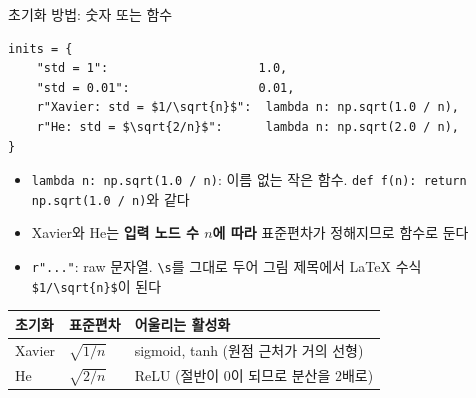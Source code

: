 \documentclass[aspectratio=169,11pt]{beamer}
\newcommand{\code}[1]{\texttt{#1}}
\begin{document}
\begin{frame}[fragile]{초기화 방법: 숫자 또는 함수}
\begin{lstlisting}
inits = {
    "std = 1":                     1.0,
    "std = 0.01":                  0.01,
    r"Xavier: std = $1/\sqrt{n}$":  lambda n: np.sqrt(1.0 / n),
    r"He: std = $\sqrt{2/n}$":      lambda n: np.sqrt(2.0 / n),
}
\end{lstlisting}
\begin{itemize}
\item \code{lambda n: np.sqrt(1.0 / n)}: 이름 없는 작은 함수. \code{def f(n): return np.sqrt(1.0 / n)}와 같다
\item Xavier와 He는 \textbf{입력 노드 수 $n$에 따라} 표준편차가 정해지므로 함수로 둔다
\item \code{r"..."}: raw 문자열. \code{\textbackslash s}를 그대로 두어 그림 제목에서 LaTeX 수식 \code{\$1/\textbackslash sqrt\{n\}\$}이 된다
\end{itemize}
\vskip1mm
\centering
\small
\renewcommand{\arraystretch}{1.2}
\begin{tabular}{lll}
\toprule
\textbf{초기화} & \textbf{표준편차} & \textbf{어울리는 활성화} \\
\midrule
Xavier & $\sqrt{1/n}$ & sigmoid, tanh (원점 근처가 거의 선형) \\
He & $\sqrt{2/n}$ & ReLU (절반이 $0$이 되므로 분산을 $2$배로) \\
\bottomrule
\end{tabular}
\end{frame}
\end{document}
